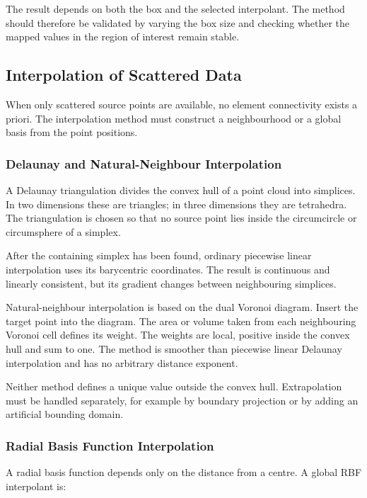 The result depends on both the box and the selected interpolant. The method
should therefore be validated by varying the box size and checking whether the
mapped values in the region of interest remain stable.

\subsection{Interpolation of Scattered Data}

When only scattered source points are available, no element connectivity exists
a priori. The interpolation method must construct a neighbourhood or a global
basis from the point positions.

\subsubsection{Delaunay and Natural-Neighbour Interpolation}

A Delaunay triangulation divides the convex hull of a point cloud into
simplices. In two dimensions these are triangles; in three dimensions they are
tetrahedra. The triangulation is chosen so that no source point lies inside the
circumcircle or circumsphere of a simplex.

After the containing simplex has been found, ordinary piecewise linear
interpolation uses its barycentric coordinates. The result is continuous and
linearly consistent, but its gradient changes between neighbouring simplices.

Natural-neighbour interpolation is based on the dual Voronoi diagram. Insert
the target point into the diagram. The area or volume taken from each
neighbouring Voronoi cell defines its weight. The weights are local, positive
inside the convex hull and sum to one. The method is smoother than piecewise
linear Delaunay interpolation and has no arbitrary distance exponent.

Neither method defines a unique value outside the convex hull. Extrapolation
must be handled separately, for example by boundary projection or by adding an
artificial bounding domain.

\subsubsection{Radial Basis Function Interpolation}

A radial basis function depends only on the distance from a centre. A global
RBF interpolant is:

